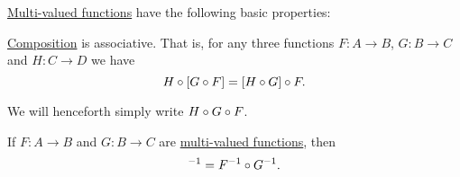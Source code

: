 \begin{proposition}\label{thm:multivalued_function_properties}
  \hyperref[def:multi_valued_function]{Multi-valued functions} have the following basic properties:

  \begin{thmenum}
     \hyperref[def:multi_valued_function/composition]{Composition} is associative. That is, for any three functions \( F: A \to B \), \( G: B \to C \) and \( H: C \to D \) we have
    \begin{equation*}
      H \mathbin \circ [G \mathbin \circ F] = [H \mathbin \circ G] \mathbin \circ F.
    \end{equation*}

    We will henceforth simply write \( H \mathbin \circ G \mathbin \circ F \).

     If \( F: A \to B \) and \( G: B \to C \) are \hyperref[def:multi_valued_function]{multi-valued functions}, then
    \begin{equation*}
      [G \bincirc F]^{-1} = F^{-1} \bincirc G^{-1}.
    \end{equation*}
  \end{thmenum}
\end{proposition}

